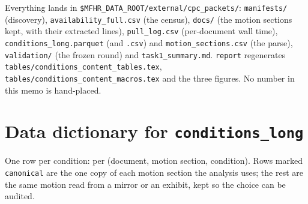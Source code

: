 \documentclass[11pt]{article}
\newcommand{\cctable}[1]{\FloatBarrier\def\cctab{#1}}
\begin{document}
Everything lands in \texttt{\$MFHR\_DATA\_ROOT/external/cpc\_packets/}:
\texttt{manifests/} (discovery), \texttt{availability\_full.csv} (the census),
\texttt{docs/} (the motion sections kept, with their extracted lines), \texttt{pull\_log.csv}
(per-document wall time), \texttt{conditions\_long.parquet} (and \texttt{.csv}) and
\texttt{motion\_sections.csv} (the parse), \texttt{validation/} (the frozen round) and
\texttt{task1\_summary.md}. \texttt{report} regenerates
\texttt{tables/conditions\_content\_tables.tex}, \texttt{tables/conditions\_content\_macros.tex}
and the three figures. No number in
this memo is hand-placed.

\appendix
\section{Data dictionary for \texttt{conditions\_long}}
\label{sec:dictionary}

One row per condition: per (document, motion section, condition). Rows marked
\texttt{canonical} are the one copy of each motion section the analysis uses; the rest are the
same motion read from a mirror or an exhibit, kept so the choice can be audited.

\cctable{dictionary}
\end{document}

